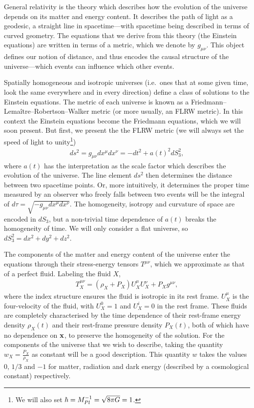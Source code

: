     General relativity is the theory which describes how the evolution of the universe depends
    on its matter and energy content. It describes the path of light as a geodesic, a straight line
    in spacetime---with spacetime being described in terms of curved geometry.
    The equations that we derive from this theory (the Einstein equations) are written in terms of a metric,
    which we denote by $g_{\mu\nu}$. This object defines our notion of distance, and thus encodes
    the causal structure of the universe---which events can influence which other events.
    

    Spatially homogeneous and isotropic universes (i.e.\ ones that at some given
    time, look the same everywhere and in every direction)
    define a class of solutions to the Einstein equations.
    The metric of each universe is known as a Friedmann–Lemaître–Robertson–Walker metric
    (or more usually, an FLRW metric). In this context
    the Einstein equations become the Friedmann equations, which we will soon present.
    But first, we present the the FLRW metric (we will always set the speed of light to unity\footnote{
        We will also set $\hbar=M_{Pl}^{-1}=\sqrt{8\pi G}=1$.
    })
    \begin{align}\label{flrw_metric}
        ds^2 = g_{\mu\nu}dx^{\mu}dx^{\nu} = - dt^2 + a(t)^2 dS_3^2,
    \end{align}
    where $a(t)$ has the interpretation as the scale factor
    which describes the evolution of the universe.
    The line element $ds^2$ then determines the distance between two spacetime points.
    Or, more intuitively, it determines the proper time measured by an observer who freely falls
    between two events will be the integral of $d\tau=\sqrt{-g_{\mu\nu}dx^\mu dx^\nu}$.
    The homogeneity, isotropy and curvature of space are encoded in $dS_3$,
    but a non-trivial time dependence of $a(t)$ breaks the homogeneity of time.
    We will only consider a flat universe, so $dS_3^2=dx^2+dy^2+dz^2$.


    The components of the matter and energy content of the universe enter the equations through
    their stress-energy tensors $T^{\mu\nu}$, which we approximate as that of
    a perfect fluid. Labeling the fluid $X$,
    \begin{align}\label{stress_tensor}
        T_X^{\mu\nu} = (\rho_X+P_X)U_X^\mu U_X^\nu+P_Xg^{\mu\nu},
    \end{align}
    where the index structure ensures the fluid is isotropic in its rest frame.
    $U_X^\mu$ is the four-velocity of the fluid, with $U_X^0=1$ and $U_X^i=0$
    in the rest frame.
    These fluids are completely characterised by the time dependence
    of their rest-frame energy density $\rho_X(t)$ and their rest-frame
    pressure density $P_X(t)$,
    both of which have no dependence on $\mathbf{x}$, to preserve the homogeneity of the solution.
    For the components of the universe that we wish to describe,
    taking the quantity $w_X=\frac{P_X}{\rho_X}$ as constant will be a good description.
    This quantity $w$ takes the values $0$, $1/3$ and $-1$ for matter, radiation
    and dark energy (described by a cosmological constant) respectively.


